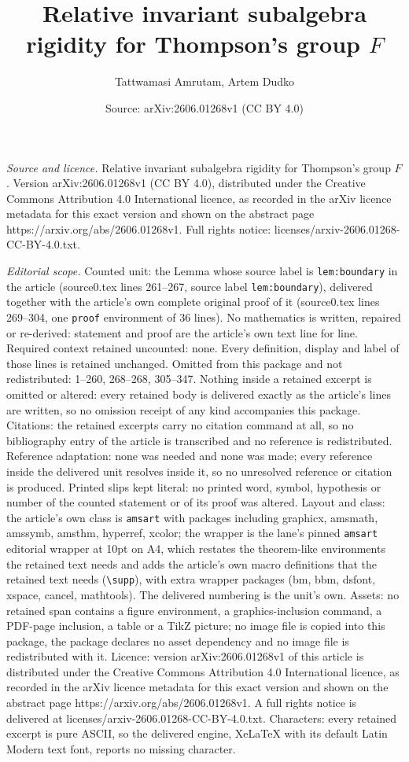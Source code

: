 \documentclass[10pt,a4paper]{amsart}
\title[Relative invariant subalgebra rigidity for Thompson's group ]{Relative invariant subalgebra rigidity for Thompson's group $F$}
\author{Tattwamasi Amrutam, Artem Dudko}
\date{Source: arXiv:2606.01268v1 (CC BY 4.0)}
\begin{document}
\maketitle

\noindent\emph{Source and licence.} Relative invariant subalgebra rigidity for Thompson's group $F$. Version arXiv:2606.01268v1 (CC BY 4.0), distributed under the Creative Commons Attribution 4.0 International licence, as recorded in the arXiv licence metadata for this exact version and shown on the abstract page https://arxiv.org/abs/2606.01268v1. Full rights notice: licenses/arxiv-2606.01268-CC-BY-4.0.txt.\par\smallskip

\noindent\textit{Editorial scope.} Counted unit: the Lemma whose source label is \texttt{lem:boundary} in the article (source0.tex lines 261--267, source label \texttt{lem:boundary}), delivered together with the article's own complete original proof of it (source0.tex lines 269--304, one \texttt{proof} environment of 36 lines). No mathematics is written, repaired or re-derived: statement and proof are the article's own text line for line. Required context retained uncounted: none. Every definition, display and label of those lines is retained unchanged. Omitted from this package and not redistributed: 1--260, 268--268, 305--347. Nothing inside a retained excerpt is omitted or altered: every retained body is delivered exactly as the article's lines are written, so no omission receipt of any kind accompanies this package. Citations: the retained excerpts carry no citation command at all, so no bibliography entry of the article is transcribed and no reference is redistributed. Reference adaptation: none was needed and none was made; every reference inside the delivered unit resolves inside it, so no unresolved reference or citation is produced. Printed slips kept literal: no printed word, symbol, hypothesis or number of the counted statement or of its proof was altered. Layout and class: the article's own class is \texttt{amsart} with packages including graphicx, amsmath, amssymb, amsthm, hyperref, xcolor; the wrapper is the lane's pinned \texttt{amsart} editorial wrapper at 10pt on A4, which restates the theorem-like environments the retained text needs and adds the article's own macro definitions that the retained text needs (\texttt{\textbackslash supp}), with extra wrapper packages (bm, bbm, dsfont, xspace, cancel, mathtools). The delivered numbering is the unit's own. Assets: no retained span contains a figure environment, a graphics-inclusion command, a PDF-page inclusion, a table or a TikZ picture; no image file is copied into this package, the package declares no asset dependency and no image file is redistributed with it. Licence: version arXiv:2606.01268v1 of this article is distributed under the Creative Commons Attribution 4.0 International licence, as recorded in the arXiv licence metadata for this exact version and shown on the abstract page https://arxiv.org/abs/2606.01268v1. A full rights notice is delivered at licenses/arxiv-2606.01268-CC-BY-4.0.txt. Characters: every retained excerpt is pure ASCII, so the delivered engine, XeLaTeX with its default Latin Modern text font, reports no missing character.
\end{document}
